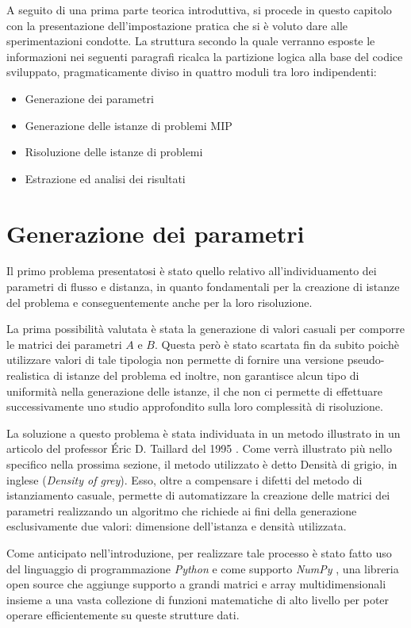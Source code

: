 A seguito di una prima parte teorica introduttiva, si procede in questo capitolo con la presentazione 
dell'impostazione pratica che si è voluto dare alle sperimentazioni condotte. La struttura secondo la quale verranno esposte 
le informazioni nei seguenti paragrafi ricalca la partizione logica alla base del codice sviluppato, pragmaticamente diviso 
in quattro moduli tra loro indipendenti:
\begin{itemize}
    \item Generazione dei parametri
    \item Generazione delle istanze di problemi MIP
    \item Risoluzione delle istanze di problemi
    \item Estrazione ed analisi dei risultati
\end{itemize}




\section{Generazione dei parametri}
Il primo problema presentatosi è stato quello relativo all'individuamento dei parametri di flusso e distanza, in quanto 
fondamentali per la creazione di istanze del problema e conseguentemente anche per la loro risoluzione.

La prima possibilità valutata è stata la generazione di valori casuali per comporre le matrici dei parametri $A$ e $B$. 
Questa però è stato scartata fin da subito poichè utilizzare valori di tale tipologia non permette di fornire una versione 
pseudo-realistica di istanze del problema ed inoltre, non garantisce alcun tipo di uniformità nella generazione delle istanze, 
il che non ci permette di effettuare successivamente uno studio approfondito sulla loro complessità di risoluzione.

La soluzione a questo problema è stata individuata in un metodo illustrato in un articolo del professor Éric D. Taillard del 1995
\cite{TAILLARD}. Come verrà illustrato più nello specifico nella prossima sezione, il metodo utilizzato è detto Densità di
grigio, in inglese (\textit{Density of grey}). Esso, oltre a compensare i difetti del metodo di istanziamento casuale, permette
di automatizzare la creazione delle matrici dei parametri realizzando un algoritmo che richiede ai fini della generazione 
esclusivamente due valori: dimensione dell'istanza e densità utilizzata.

Come anticipato nell'introduzione, per realizzare tale processo è stato fatto uso del linguaggio di programmazione \textit{Python} 
\cite{python} e come supporto \textit{NumPy} \cite{NumPy}, una libreria open source che aggiunge supporto a grandi matrici 
e array multidimensionali insieme a una vasta collezione di funzioni matematiche di alto livello per poter operare efficientemente 
su queste strutture dati.

